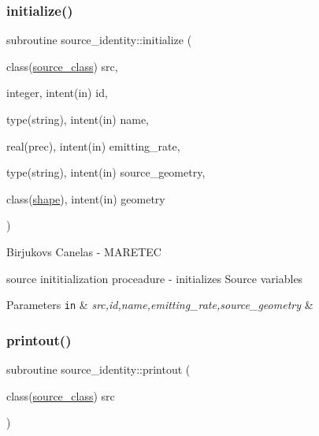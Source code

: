 \subsubsection{\texorpdfstring{initialize()}{initialize()}}
{\footnotesize\ttfamily subroutine source\+\_\+identity\+::initialize (\begin{DoxyParamCaption}\item[{class(\mbox{\hyperlink{structsource__identity_1_1source__class}{source\+\_\+class}})}]{src,  }\item[{integer, intent(in)}]{id,  }\item[{type(string), intent(in)}]{name,  }\item[{real(prec), intent(in)}]{emitting\+\_\+rate,  }\item[{type(string), intent(in)}]{source\+\_\+geometry,  }\item[{class(\mbox{\hyperlink{structgeometry_1_1shape}{shape}}), intent(in)}]{geometry }\end{DoxyParamCaption})\hspace{0.3cm}{\ttfamily [private]}}



Birjukovs Canelas -\/ M\+A\+R\+E\+T\+EC 

source inititialization proceadure -\/ initializes Source variables 
\begin{DoxyParams}[1]{Parameters}
\mbox{\tt in}  & {\em src,id,name,emitting\+\_\+rate,source\+\_\+geometry} & \\
\hline
\end{DoxyParams}
\mbox{\label{namespacesource__identity_a9715a7d707b4c80aa2d2ebd08712f6a9}} 
\subsubsection{\texorpdfstring{printout()}{printout()}}
{\footnotesize\ttfamily subroutine source\+\_\+identity\+::printout (\begin{DoxyParamCaption}\item[{class(\mbox{\hyperlink{structsource__identity_1_1source__class}{source\+\_\+class}})}]{src }\end{DoxyParamCaption})\hspace{0.3cm}{\ttfamily [private]}}



